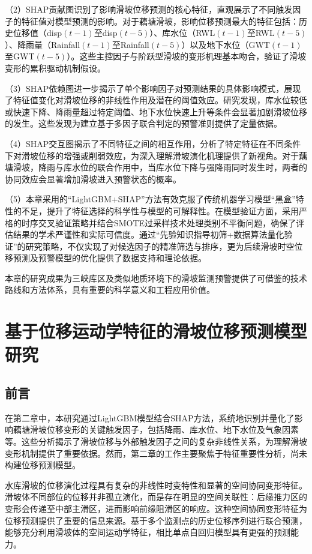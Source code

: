 \documentclass[12pt,a4paper]{article}
\begin{document}
    （2）SHAP贡献图识别了影响滑坡位移预测的核心特征，直观展示了不同触发因子的特征值对模型预测的影响。对于藕塘滑坡，影响位移预测最大的特征包括：历史位移值（disp$(t-1)$至disp$(t-5)$）、库水位（RWL$(t-1)$至RWL$(t-5)$）、降雨量（Rainfall$(t-1)$至Rainfall$(t-5)$）以及地下水位（GWT$(t-1)$至GWT$(t-5)$）。这些主控因子与阶跃型滑坡的变形机理基本吻合，验证了滑坡变形的累积驱动机制假设。

    （3）SHAP依赖图进一步揭示了单个影响因子对预测结果的具体影响模式，展现了特征值变化对滑坡位移的非线性作用及潜在的阈值效应。研究发现，库水位较低或快速下降、降雨量超过特定阈值、地下水位快速上升等条件会显著加剧滑坡位移的发生。这些发现为建立基于多因子联合判定的预警准则提供了定量依据。

    （4）SHAP交互图揭示了不同特征之间的相互作用，分析了特定特征在不同条件下对滑坡位移的增强或削弱效应，为深入理解滑坡演化机理提供了新视角。对于藕塘滑坡，降雨与库水位的联合作用中，当库水位下降与强降雨同时发生时，两者的协同效应会显著增加滑坡进入预警状态的概率。

    （5）本章采用的“LightGBM+SHAP”方法有效克服了传统机器学习模型“黑盒”特性的不足，提升了特征选择的科学性与模型的可解释性。在模型验证方面，采用严格的时序交叉验证策略并结合SMOTE过采样技术处理类别不平衡问题，确保了评估结果的学术严谨性和实际可信度。通过“先验知识指导初筛+数据算法量化验证”的研究策略，不仅实现了对候选因子的精准筛选与排序，更为后续滑坡时空位移预测及预警模型的优化提供了数据支持和理论依据。

本章的研究成果为三峡库区及类似地质环境下的滑坡监测预警提供了可借鉴的技术路线和方法体系，具有重要的科学意义和工程应用价值。

\section{基于位移运动学特征的滑坡位移预测模型研究}

\subsection{前言}

在第二章中，本研究通过LightGBM模型结合SHAP方法，系统地识别并量化了影响藕塘滑坡位移变形的关键触发因子，包括降雨、库水位、地下水位及气象因素等。这些分析揭示了滑坡位移与外部触发因子之间的复杂非线性关系，为理解滑坡变形机制提供了重要依据。然而，第二章的工作主要聚焦于特征重要性分析，尚未构建位移预测模型。

水库滑坡的位移演化过程具有复杂的非线性时变特性和显著的空间协同变形特征。滑坡体不同部位的位移并非孤立演化，而是存在明显的空间关联性：后缘推力区的变形会传递至中部主滑区，进而影响前缘阻滑区的响应。这种空间协同变形特征为位移预测提供了重要的信息来源。基于多个监测点的历史位移序列进行联合预测，能够充分利用滑坡体的空间运动学特征，相比单点自回归模型具有更强的预测能力。
\end{document}
